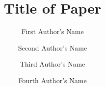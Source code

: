 \title{Title of Paper}

\author[1]{First Author's Name}

\author[1]{Second Author's Name}

\author[2]{Third Author's Name}

\author[3]{Fourth Author's Name}

\address[1]{Department 1, University 1, City 1, Country 1}
\address[2]{Department 2, University 2, City 2, Country 2}
\address[3]{Department 3, University 3, City 3, Country 3}


